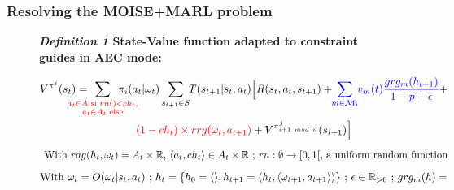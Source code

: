 \documentclass[pdflatex,sn-mathphys-num]{sn-jnl}%
\theoremstyle{thmstyleone}%
\theoremstyle{thmstyletwo}%
\theoremstyle{thmstylethree}%
\begin{document}
\subsubsection{Resolving the MOISE+MARL problem}


\begin{figure}[t]
    \label{eq:single_value_function}
    \raggedright
    \textbf{\textit{Definition 1} \quad State-Value function adapted to constraint guides in AEC mode:}
    
    \begin{scriptsize}
        \vspace{-0.3cm}
        \begin{gather*}
            V^{\pi^j}(s_t) = \hspace{-0.75cm}
            \sum_{\textcolor{red}{ \substack{a_{t} \in A \text{ si } rn() < ch_{t}, \\
                        a_{t} \in A_{t} \text{ else}}
                }}{\hspace{-0.7cm} \pi_i(a_{t} | \omega_t)}
            \sum_{s_{t+1} \in S}
            {\hspace{-0.1cm} T(s_{t+1} | s_t, a_{t})
            \Bigl[R(s_t,a_{t},s_{t+1}) + \hspace{-0.1cm}
            \textcolor{blue}{ \sum_{m \in \mathcal{M}_i}{ \hspace{-0.1cm} v_m(t) \frac{grg_m(h_{t+1})}{1 - p + \epsilon} } }
            + } \\
            {\textcolor{red}{(1-ch_t) \times rrg(\omega_t,a_{t+1})} + V^{\pi^j_{i+1 \ mod \ n}}(s_{t+1})\Bigr]}
        \end{gather*}
        \textcolor{red}{\[\text{ \hspace{-0.1cm} With } rag(h_t, \omega_t) = A_{t} \times \mathbb{R} \text{, } \langle a_t, ch_{t} \rangle \in A_{t} \times \mathbb{R} \text{ ; } rn: \emptyset \to [0,1[ \text{, a uniform random function}\]}
        \vspace{-0.5cm}
        \textcolor{blue}{
            \begin{gather*}
                \hspace{-0.001cm}
                \text{With } \omega_t = O(\omega_t | s_t, a_t) \text{ ; } h_t = \{h_0 = \langle \rangle, h_{t+1} = \langle h_t, \langle \omega_{t+1}, a_{t+1} \rangle \rangle \} \text{ ; } \epsilon \in \mathbb{R}_{>0} \text{ ; } grg_m(h) = 
            \end{gather*}
        }
        \vspace{-0.75cm}

\end{scriptsize}
\end{figure}
\end{document}
